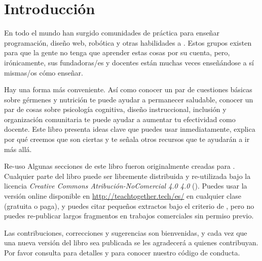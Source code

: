 \chapter{Introducción}\label{s:intro}

En todo el mundo han surgido comunidades de práctica
para enseñar programación, diseño web, robótica y otras habilidades 
a .
Estos grupos existen para que la gente no tenga que aprender estas cosas por su cuenta,
pero, irónicamente,
sus fundadoras/es y docentes están muchas veces enseñándose a sí mismas/os cómo enseñar.

Hay una forma más conveniente.
Así como conocer un par de cuestiones básicas sobre gérmenes y nutrición te puede ayudar a permanecer saludable,
conocer un par de cosas sobre psicología cognitiva,
diseño instruccional,
inclusión
y organización comunitaria
te puede ayudar a aumentar tu efectividad como docente.
Este libro presenta ideas clave que puedes usar inmediatamente,
explica por qué creemos que son ciertas
y te señala otros recursos que te ayudarán a ir más allá.

\begin{aside}{Re-uso}
Algunas secciones de este libro fueron originalmente creadas para
 .
 Cualquier parte del libro puede ser libremente distribuida y re-utilizada
bajo la licencia \emph{Creative Commons Atribución-NoComercial 4.0 4.0}
 ().
Puedes usar la versión online disponible en \url{http://teachtogether.tech/es/} 
en cualquier clase
(gratuita o paga),
y puedes citar pequeños extractos bajo el criterio de ,
pero no puedes re-publicar largos fragmentos en trabajos comerciales sin permiso previo.

Las contribuciones, correcciones y sugerencias son bienvenidas,
y cada vez que una nueva versión del libro sea publicada se les agradecerá a quienes contribuyan.
Por favor consulta  para detalles
y  para conocer nuestro código de conducta. 
\end{aside}

